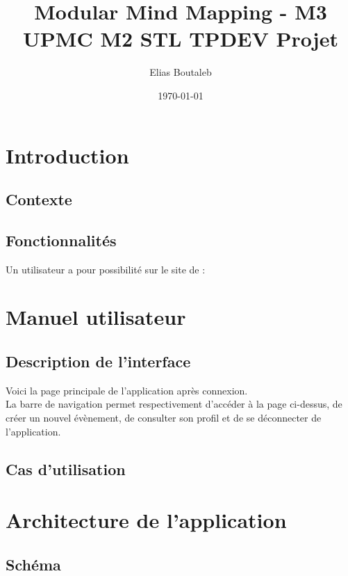 \documentclass[11pt,a4paper,margin=0.5in]{report}
\title{Modular Mind Mapping - M3 \\ UPMC M2 STL TPDEV Projet}
\author{Elias Boutaleb}
\date{\today}
\begin{document}
\maketitle
\tableofcontents

\chapter{Introduction}

\section{Contexte}

\section{Fonctionnalités}

Un utilisateur a pour possibilité sur le site de :

\chapter{Manuel utilisateur}

\section{Description de l'interface}


Voici la page principale de l'application après connexion.\\
La barre de navigation permet respectivement d'accéder à la page ci-dessus, de créer un nouvel évènement, de consulter son profil et de se déconnecter
de l'application.\\


\clearpage

\section{Cas d'utilisation}


\chapter{Architecture de l'application}

\section{Schéma}
\end{document}
